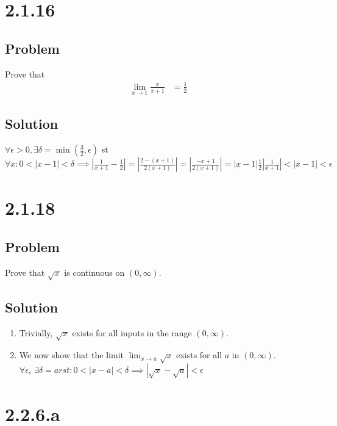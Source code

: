 \documentclass[12pt]{article}
\newcommand{\round}[1]{\left(       #1 \right)      }
\newcommand{\abs}  [1]{\left|       #1 \right|      }
\begin{document}
\section*{2.1.16}

\subsection*{Problem}
Prove that
\begin{align*}
    \lim_{x \to 1} \frac{x}{x + 1} &= \frac{1}{2}
\end{align*}

\subsection*{Solution}
$\forall \epsilon > 0, \exists \delta = \min\round{\frac{3}{2}, \epsilon}$ st $\forall x : 0 < \abs{x - 1} < \delta \implies \abs{\frac{1}{x + 1} - \frac{1}{2}} = \abs{\frac{2 - (x + 1)}{2(x + 1)}} = \abs{\frac{-x + 1}{2(x + 1)}} = \abs{x - 1} \frac{1}{2} \abs{\frac{1}{x + 1}} < \abs{x - 1} < \epsilon$



\section*{2.1.18}

\subsection*{Problem}
Prove that $\sqrt{x}$ is continuous on $(0, \infty)$.

\subsection*{Solution}
\begin{enumerate}
    \item Trivially, $\sqrt{x}$ exists for all inputs in the range $(0, \infty)$.
    \item We now show that the limit $\lim_{x \to a} \sqrt{x}$ exists for all $a$ in $(0, \infty)$. $\forall \epsilon,\ \exists \delta = arst : 0 < \abs{x - a} < \delta \implies \abs{\sqrt{x} - \sqrt{a}} < \epsilon$
\end{enumerate}



\section*{2.2.6.a}
\end{document}
